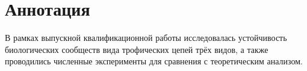 \section*{Аннотация}
В рамках выпускной квалификационной работы исследовалась устойчивость биологических сообществ вида трофических цепей трёх видов, а также проводились численные эксперименты для сравнения с теоретическим анализом.